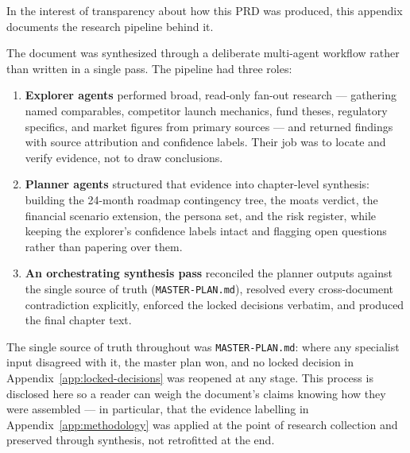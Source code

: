 In the interest of transparency about how this PRD was produced, this appendix
documents the research pipeline behind it.

The document was synthesized through a deliberate multi-agent workflow rather
than written in a single pass. The pipeline had three roles:

\begin{enumerate}
  \item \textbf{Explorer agents} performed broad, read-only fan-out research ---
        gathering named comparables, competitor launch mechanics, fund theses,
        regulatory specifics, and market figures from primary sources --- and
        returned findings with source attribution and confidence labels. Their
        job was to locate and verify evidence, not to draw conclusions.

  \item \textbf{Planner agents} structured that evidence into chapter-level
        synthesis: building the 24-month roadmap contingency tree, the moats
        verdict, the financial scenario extension, the persona set, and the
        risk register, while keeping the explorer's confidence labels intact and
        flagging open questions rather than papering over them.

  \item \textbf{An orchestrating synthesis pass} reconciled the planner outputs
        against the single source of truth (\texttt{MASTER-PLAN.md}), resolved
        every cross-document contradiction explicitly, enforced the locked
        decisions verbatim, and produced the final chapter text.
\end{enumerate}

The single source of truth throughout was \texttt{MASTER-PLAN.md}: where any
specialist input disagreed with it, the master plan won, and no locked decision
in Appendix~\ref{app:locked-decisions} was reopened at any stage. This process
is disclosed here so a reader can weigh the document's claims knowing how they
were assembled --- in particular, that the evidence labelling in
Appendix~\ref{app:methodology} was applied at the point of research collection
and preserved through synthesis, not retrofitted at the end.
